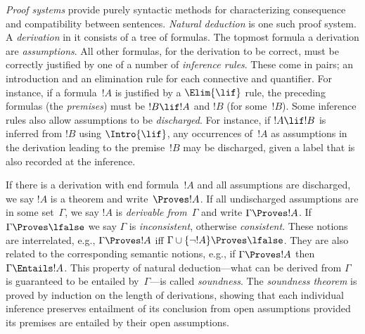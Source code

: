 \emph{Proof systems} provide purely syntactic methods for
characterizing consequence and compatibility between sentences.
\emph{Natural deduction} is one such proof system. A \emph{derivation}
in it consists of a tree of formulas. The topmost formula a derivation
are \emph{assumptions}. All other formulas, for the derivation to be
correct, must be correctly justified by one of a number of
\emph{inference rules}. These come in pairs; an introduction and an
elimination rule for each connective and quantifier. For instance, if
a formula~$!A$ is justified by a $\Elim{\lif}$ rule, the preceding
formulas (the \emph{premises}) must be $!B \lif !A$ and $!B$ (for
some~$!B$). Some inference rules also allow assumptions to be
\emph{discharged}. For instance, if $!A \lif !B$ is inferred from $!B$
using $\Intro{\lif}$, any occurrences of~$!A$ as assumptions in the
derivation leading to the premise~$!B$ may be discharged, given a
label that is also recorded at the inference.

If there is a derivation with end formula~$!A$ and all assumptions are
discharged, we say $!A$ is a theorem and write~$\Proves !A$. If all
undischarged assumptions are in some set~$\Gamma$, we say $!A$ is
\emph{derivable from}~$\Gamma$ and write $\Gamma \Proves !A$. If
$\Gamma \Proves \lfalse$ we say $\Gamma$ is \emph{inconsistent},
otherwise \emph{consistent}. These notions are interrelated, e.g.,
$\Gamma \Proves !A$ iff $\Gamma \cup \{\lnot !A\} \Proves
\lfalse$. They are also related to the corresponding semantic notions,
e.g., if $\Gamma \Proves !A$ then $\Gamma \Entails !A$. This property
of natural deduction---what can be derived from $\Gamma$ is guaranteed
to be entailed by~$\Gamma$---is called \emph{soundness}. The
\emph{soundness theorem} is proved by induction on the length of
derivations, showing that each individual inference preserves
entailment of its conclusion from open assumptions provided its premises are
entailed by their open assumptions.
